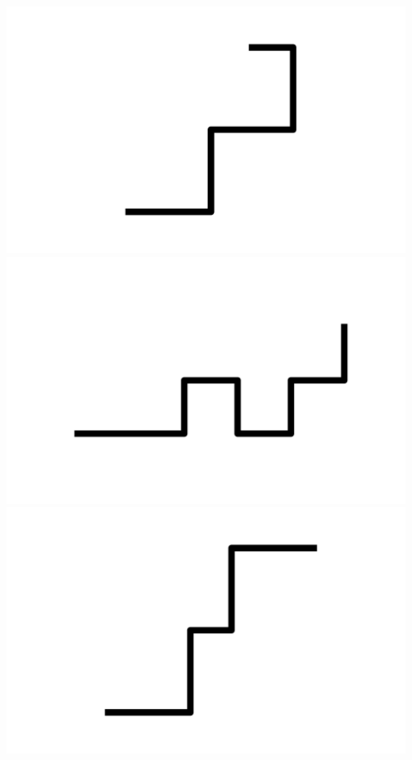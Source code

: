 \documentclass[]{report}
\begin{document}
\includegraphics[scale=.1]{pictures/21/state_cluster_shapes_367.pdf} 
\includegraphics[scale=.1]{pictures/21/state_cluster_shapes_368.pdf} 
\includegraphics[scale=.1]{pictures/21/state_cluster_shapes_369.pdf} 
\end{document}
